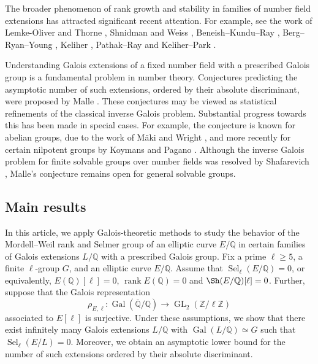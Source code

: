 \documentclass[11pt,reqno]{amsart}
\newcommand{\Z}{\mathbb{Z}}
\newcommand{\Q}{\mathbb{Q}}
\newcommand{\op}[1]{\operatorname{#1}}
\numberwithin{equation}{section}
\begin{document}
The broader phenomenon of rank growth and stability in families of number field extensions has attracted significant recent attention. For example, see the work of Lemke-Oliver and Thorne \cite{Oliverthorne}, Shnidman and Weiss \cite{ShnidmanWeiss}, Beneish--Kundu--Ray \cite{BKR}, Berg--Ryan--Young \cite{Berg}, Keliher \cite{keliher}, Pathak--Ray \cite{pathakray} and Keliher--Park \cite{keliherpark}. %

Understanding Galois extensions of a fixed number field with a prescribed Galois group is a fundamental problem in number theory. Conjectures predicting the asymptotic number of such extensions, ordered by their absolute discriminant, were proposed by Malle \cite{Malle1, Malle2}. These conjectures may be viewed as statistical refinements of the classical inverse Galois problem. Substantial progress towards this has been made in special cases. For example, the conjecture is known for abelian groups, due to the work of Mäki \cite{maki1985density} and Wright \cite{wright1989distribution}, and more recently for certain nilpotent groups by Koymans and Pagano \cite{koymans2023malle}. Although the inverse Galois problem for finite solvable groups over number fields was resolved by Shafarevich \cite{Shaferevich}, Malle’s conjecture remains open for general solvable groups.

\subsection{Main results}
In this article, we apply Galois-theoretic methods to study the behavior of the Mordell–Weil rank and Selmer group of an elliptic curve \( E/\Q \) in certain families of Galois extensions \( L/\Q \) with a prescribed Galois group. Fix a prime \( \ell \geq 5 \), a finite \( \ell \)-group \( G \), and an elliptic curve \( E/\Q \). Assume that \( \operatorname{Sel}_\ell(E/\Q) = 0 \), or equivalently, $E(\Q)[\ell]=0$, $\op{rank}E(\Q)=0$ and $\Sh(E/\Q)[\ell]=0$. Further, suppose that the Galois representation
\[
\rho_{E,\ell} : \operatorname{Gal}(\overline{\Q}/\Q) \longrightarrow \operatorname{GL}_2(\Z/\ell\Z)
\]
associated to \( E[\ell] \) is surjective. Under these assumptions, we show that there exist infinitely many Galois extensions \( L/\Q \) with \( \operatorname{Gal}(L/\Q) \simeq G \) such that \( \operatorname{Sel}_\ell(E/L) = 0 \). Moreover, we obtain an asymptotic lower bound for the number of such extensions ordered by their absolute discriminant.
\end{document}
